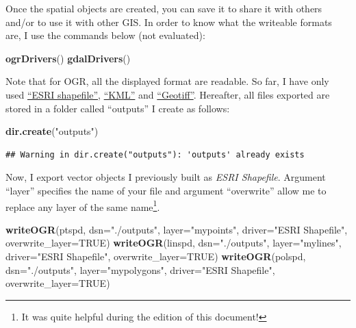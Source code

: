 \documentclass[]{report}
\newenvironment{Shaded}{\begin{snugshade}}{\end{snugshade}}
\newcommand{\DataTypeTok}[1]{\textcolor[rgb]{0.13,0.29,0.53}{#1}}
\newcommand{\KeywordTok}[1]{\textcolor[rgb]{0.13,0.29,0.53}{\textbf{#1}}}
\newcommand{\NormalTok}[1]{#1}
\newcommand{\OtherTok}[1]{\textcolor[rgb]{0.56,0.35,0.01}{#1}}
\newcommand{\StringTok}[1]{\textcolor[rgb]{0.31,0.60,0.02}{#1}}
\let\rmarkdownfootnote\footnote%
\def\footnote{\protect\rmarkdownfootnote}
\begin{document}
Once the spatial objects are created, you can save it to share it with
others and/or to use it with other GIS. In order to know what the
writeable formats are, I use the commands below (not evaluated):

\begin{Shaded}
\begin{Highlighting}[]
\KeywordTok{ogrDrivers}\NormalTok{()}
\KeywordTok{gdalDrivers}\NormalTok{()}
\end{Highlighting}
\end{Shaded}

Note that for OGR, all the displayed format are readable. So far, I have
only used \href{https://en.wikipedia.org/wiki/Shapefile}{``ESRI
shapefile''},
\href{https://en.wikipedia.org/wiki/Keyhole_Markup_Language}{``KML''}
and \href{https://en.wikipedia.org/wiki/GeoTIFF}{``Geotiff''}.
Hereafter, all files exported are stored in a folder called ``outputs''
I create as follows:

\begin{Shaded}
\begin{Highlighting}[]
\KeywordTok{dir.create}\NormalTok{(}\StringTok{"outputs"}\NormalTok{)}
\end{Highlighting}
\end{Shaded}

\begin{verbatim}
## Warning in dir.create("outputs"): 'outputs' already exists
\end{verbatim}

Now, I export vector objects I previously built as \emph{ESRI
Shapefile}. Argument ``layer'' specifies the name of your file and
argument ``overwrite'' allow me to replace any layer of the same
name\footnote{It was quite helpful during the edition of this document!}.

\begin{Shaded}
\begin{Highlighting}[]
\KeywordTok{writeOGR}\NormalTok{(ptspd, }\DataTypeTok{dsn=}\StringTok{"./outputs"}\NormalTok{, }\DataTypeTok{layer=}\StringTok{"mypoints"}\NormalTok{,}
    \DataTypeTok{driver=}\StringTok{"ESRI Shapefile"}\NormalTok{, }\DataTypeTok{overwrite_layer=}\OtherTok{TRUE}\NormalTok{)}
\KeywordTok{writeOGR}\NormalTok{(linspd, }\DataTypeTok{dsn=}\StringTok{"./outputs"}\NormalTok{, }\DataTypeTok{layer=}\StringTok{"mylines"}\NormalTok{,}
    \DataTypeTok{driver=}\StringTok{"ESRI Shapefile"}\NormalTok{, }\DataTypeTok{overwrite_layer=}\OtherTok{TRUE}\NormalTok{)}
\KeywordTok{writeOGR}\NormalTok{(polspd, }\DataTypeTok{dsn=}\StringTok{"./outputs"}\NormalTok{, }\DataTypeTok{layer=}\StringTok{"mypolygons"}\NormalTok{,}
    \DataTypeTok{driver=}\StringTok{"ESRI Shapefile"}\NormalTok{, }\DataTypeTok{overwrite_layer=}\OtherTok{TRUE}\NormalTok{)}
\end{Highlighting}
\end{Shaded}
\end{document}
